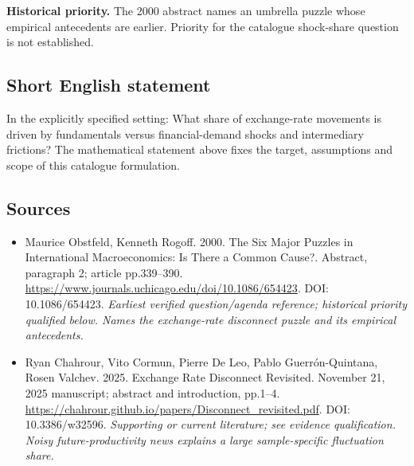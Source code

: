 \documentclass[11pt]{article}
\begin{document}
\par\textbf{Historical priority.} The 2000 abstract names an umbrella puzzle whose empirical antecedents are earlier. Priority for the catalogue shock-share question is not established.

\subsection{Short English statement}
In the explicitly specified setting: What share of exchange-rate movements is driven by fundamentals versus financial-demand shocks and intermediary frictions? The mathematical statement above fixes the target, assumptions and scope of this catalogue formulation.

\subsection{Sources}
\begin{itemize}\raggedright
\item[\textnormal{[S1]}]\hypertarget{source:30007613:1}{} Maurice Obstfeld, Kenneth Rogoff. 2000. The Six Major Puzzles in International Macroeconomics: Is There a Common Cause?. Abstract, paragraph 2; article pp.339–390.
\url{https://www.journals.uchicago.edu/doi/10.1086/654423}.
DOI: 10.1086/654423.
{\small\textit{Earliest verified question/agenda reference; historical priority qualified below. Names the exchange-rate disconnect puzzle and its empirical antecedents.}}

\item[\textnormal{[S2]}]\hypertarget{source:30007613:2}{} Ryan Chahrour, Vito Cormun, Pierre De Leo, Pablo Guerrón-Quintana, Rosen Valchev. 2025. Exchange Rate Disconnect Revisited. November 21, 2025 manuscript; abstract and introduction, pp.1–4.
\url{https://chahrour.github.io/papers/Disconnect_revisited.pdf}.
DOI: 10.3386/w32596.
{\small\textit{Supporting or current literature; see evidence qualification. Noisy future-productivity news explains a large sample-specific fluctuation share.}}
\end{itemize}
\end{document}
